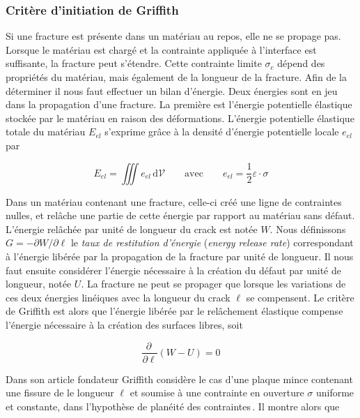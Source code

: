 \subsubsection{Critère d'initiation de Griffith}


Si une fracture est présente dans un matériau au repos, elle ne se propage pas. Lorsque le matériau est chargé et la contrainte appliquée à l'interface est suffisante, la fracture peut s'étendre. Cette contrainte limite $\sigma_c$ dépend des propriétés du matériau, mais également de la longueur de la fracture. Afin de la déterminer il nous faut effectuer un bilan d'énergie. Deux énergies sont en jeu dans la propagation d'une fracture. La première est l'énergie potentielle élastique stockée par le matériau en raison des déformations. L'énergie potentielle élastique totale du matériau $E_{el}$ s'exprime grâce à la densité d'énergie potentielle locale $e_{el}$ par

\begin{equation}
E_{el} = \iiint e_{el}\,\mathrm{d}\mathcal{V}\qquad\text{avec}\qquad e_{el}=\frac{1}{2}\varepsilon\cdot\sigma
\end{equation}


Dans un matériau contenant une fracture, celle-ci créé une ligne de contraintes nulles, et relâche une partie de cette énergie par rapport au matériau sans défaut. L'énergie relâchée par unité de longueur du crack est notée $W$. Nous définissons $G=-\partial W/\partial\ell$ le \textit{taux de restitution d'énergie} (\textit{energy release rate}) correspondant à l'énergie libérée par la propagation de la fracture par unité de longueur. Il nous faut ensuite considérer l'énergie nécessaire à la création du défaut par unité de longueur, notée $U$. La fracture ne peut se propager que lorsque les variations de ces deux énergies linéiques avec la longueur du crack $\ell$ se compensent. Le critère de Griffith est alors que l'énergie libérée par le relâchement élastique compense l'énergie nécessaire à la création des surfaces libres, soit

\begin{equation}
\dfrac{\partial\:}{\partial\ell}\left(W-U\right)=0
\end{equation}

Dans son article fondateur Griffith considère le cas d'une plaque mince contenant une fissure de le longueur $\ell$ et soumise à une contrainte en ouverture $\sigma$ uniforme et constante, dans l'hypothèse de planéité des contraintes\,\cite{griffith_phenomena_1921}. Il montre alors que

